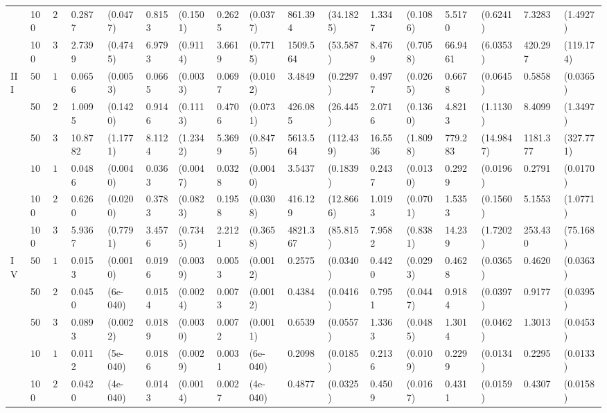 \begin{landscape}
\begin{table}[H]
\begin{footnotesize}
\begin{tabular}{lllllllllllllllll}
    &  100 & $20$ & 0.2877 & (0.0477) & 0.8153 & (0.1501) & 0.2625 & (0.0377) & 861.394 & (34.1825) & 1.3347 & (0.1086) & 5.5170 & (0.6241) & 7.3283 & (1.4927) \\ 
    & 100  & $30$ & 2.7399 & (0.4745) & 6.9793 & (0.9114) & 3.6619 & (0.7715) & 1509.564 & (53.587) & 8.4769 & (0.7058) & 66.9461 & (6.0353) & 420.297 & (119.174) \\ 
   III & $50$ & $10$ & 0.0656 & (0.0053) & 0.0665 & (0.0033) & 0.0697 & (0.0102) & 3.4849 & (0.2297) & 0.4977 & (0.0265) & 0.6678 & (0.0645) & 0.5858 & (0.0365) \\ 
    &  50 & $20$ & 1.0095 & (0.1420) & 0.9146 & (0.1113) & 0.4706 & (0.0731) & 426.085 & (26.445) & 2.0716 & (0.1360) & 4.8213 & (1.1130) & 8.4099 & (1.3497) \\ 
    & 50  & $30$ & 10.8782 & (1.1771) & 8.1124 & (1.2342) & 5.3699 & (0.8475) & 5613.564 & (112.439) & 16.5536 & (1.8098) & 779.283 & (14.9847) & 1181.377 & (327.771) \\ 
    & $100$ & $10$ & 0.0486 & (0.0040) & 0.0363 & (0.0047) & 0.0328 & (0.0040) & 3.5437 & (0.1839) & 0.2437 & (0.0130) & 0.2929 & (0.0196) & 0.2791 & (0.0170) \\ 
    & 100  & $20$ & 0.6260 & (0.0200) & 0.3783 & (0.0823) & 0.1958 & (0.0308) & 416.129 & (12.8666) & 1.0193 & (0.0701) & 1.5353 & (0.1560) & 5.1553 & (1.0771) \\ 
    &  100 & $30$ & 5.9367 & (0.7791) & 3.4576 & (0.7345) & 2.2121 & (0.3658) & 4821.367 & (85.815) & 7.9582 & (0.8381) & 14.239 & (1.7202) & 253.430 & (75.168) \\ 
  IV & $50$ & $10$ & 0.0153 & (0.0010) & 0.0196 & (0.0039) & 0.0053 & (0.0012) & 0.2575 & (0.0340) & 0.4420 & (0.0293) & 0.4628 & (0.0365) & 0.4620 & (0.0363) \\ 
    & 50  & $20$ & 0.0450 & (6e-040) & 0.0154 & (0.0024) & 0.0073 & (0.0012) & 0.4384 & (0.0416) & 0.7951 & (0.0447) & 0.9184 & (0.0397) & 0.9177 & (0.0395) \\ 
    & 50  & $30$ & 0.0893 & (0.0022) & 0.0189 & (0.0030) & 0.0072 & (0.0011) & 0.6539 & (0.0557) & 1.3363 & (0.0485) & 1.3014 & (0.0462) & 1.3013 & (0.0453) \\ 
    & $100$ & $10$ & 0.0112 & (5e-040) & 0.0186 & (0.0029) & 0.0031 & (6e-040) & 0.2098 & (0.0185) & 0.2136 & (0.0109) & 0.2299 & (0.0134) & 0.2295 & (0.0133) \\ 
    & 100  & $20$ & 0.0420 & (4e-040) & 0.0143 & (0.0014) & 0.0027 & (4e-040) & 0.4877 & (0.0325) & 0.4509 & (0.0167) & 0.4311 & (0.0159) & 0.4307 & (0.0158) \\ 

\end{tabular}
\end{footnotesize}
\end{table}
\end{landscape}
